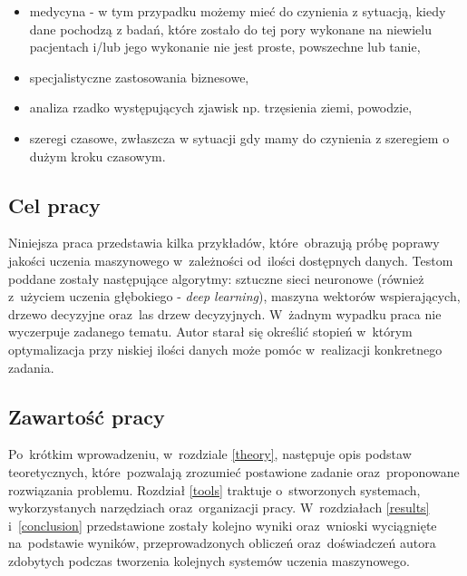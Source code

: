 \begin{itemize}
\item medycyna - w tym przypadku możemy mieć do czynienia z sytuacją, kiedy dane pochodzą z badań, które zostało do tej pory wykonane na niewielu pacjentach i/lub jego wykonanie nie jest proste, powszechne lub tanie,
\item specjalistyczne zastosowania biznesowe,
\item analiza rzadko występujących zjawisk np. trzęsienia ziemi, powodzie,
\item szeregi czasowe,  zwłaszcza w sytuacji gdy mamy do czynienia z szeregiem o dużym kroku czasowym.
\end{itemize}

\subsection{Cel pracy}
Niniejsza praca przedstawia kilka przykładów, które~obrazują próbę poprawy jakości uczenia maszynowego w~zależności od~ilości dostępnych danych. Testom poddane  zostały następujące algorytmy: sztuczne sieci neuronowe (również z~użyciem uczenia głębokiego - \textit{deep learning}), maszyna wektorów wspierających, drzewo decyzyjne oraz~las drzew decyzyjnych. W~żadnym wypadku praca nie wyczerpuje zadanego tematu. Autor starał się określić stopień w~którym optymalizacja przy niskiej ilości danych może pomóc w~realizacji konkretnego zadania.

\subsection{Zawartość pracy}
Po~krótkim wprowadzeniu, w~rozdziale \ref{theory}, następuje opis podstaw teoretycznych, które~pozwalają zrozumieć postawione zadanie oraz~proponowane rozwiązania problemu. Rozdział \ref{tools} traktuje o~stworzonych systemach, wykorzystanych narzędziach oraz~organizacji pracy. W~rozdziałach \ref{results} i~\ref{conclusion} przedstawione zostały kolejno wyniki oraz~wnioski wyciągnięte na~podstawie wyników, przeprowadzonych obliczeń oraz~doświadczeń autora zdobytych podczas tworzenia kolejnych systemów uczenia maszynowego.



